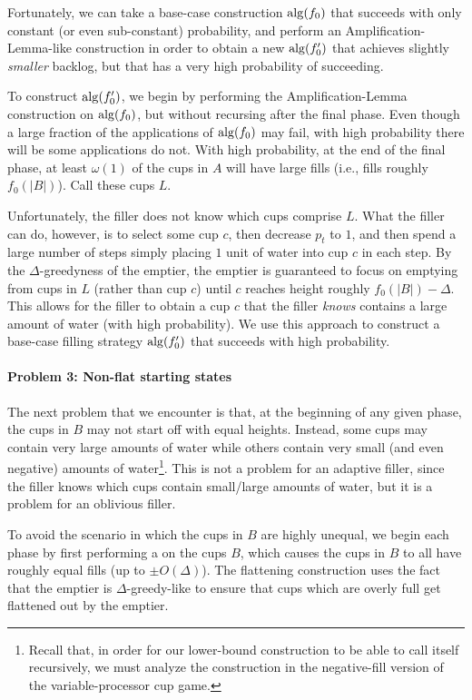 Fortunately, we can take a base-case construction $\operatorname{\text{\textup{alg}}}(f_0)$ that
succeeds with only constant (or even sub-constant) probability, and
perform an Amplification-Lemma-like construction in order to obtain a
new $\operatorname{\text{\textup{alg}}}(f_0')$ that achieves slightly \emph{smaller} backlog, but
that has a very high probability of succeeding.

To construct $\operatorname{\text{\textup{alg}}}(f_0')$, we begin by performing the
Amplification-Lemma construction on $\operatorname{\text{\textup{alg}}}(f_0)$, but without recursing
after the final phase. Even though a large fraction of the
applications of $\operatorname{\text{\textup{alg}}}(f_0)$ may fail, with high probability there will
be some applications do not. With high probability, at the end of the
final phase, at least $\omega(1)$ of the cups in $A$ will have large fills
(i.e., fills roughly $f_0(|B|)$). Call these cups $L$.

Unfortunately, the filler does not know which cups comprise $L$. What
the filler can do, however, is to select some cup $c$, then decrease
$p_t$ to $1$, and then spend a large number of steps simply placing
$1$ unit of water into cup $c$ in each step. By the
$\Delta$-greedyness of the emptier, the emptier is guaranteed to focus
on emptying from cups in $L$ (rather than cup $c$) until $c$ reaches
height roughly $f_0(|B|) - \Delta$. This allows for the filler to
obtain a cup $c$ that the filler \emph{knows} contains a large amount
of water (with high probability). We use this approach to construct a
base-case filling strategy $\operatorname{\text{\textup{alg}}}(f_0')$ that succeeds with high
probability.

\paragraph{Problem 3: Non-flat starting states}
The next problem that we encounter is that, at the beginning of any
given phase, the cups in $B$ may not start off with equal
heights. Instead, some cups may contain very large amounts of water
while others contain very small (and even negative) amounts of
water\footnote{Recall that, in order for our lower-bound construction to be able to call itself recursively, we must analyze the construction in the negative-fill version of the variable-processor cup game.}. This is not a problem for an adaptive filler, since the filler
knows which cups contain small/large amounts of water, but it is a
problem for an oblivious filler.

To avoid the scenario in which the cups in $B$ are highly unequal, we
begin each phase by first performing a 
on the cups $B$, which causes the cups in $B$ to all have roughly
equal fills (up to $\pm O(\Delta)$). The flattening construction uses
the fact that the emptier is $\Delta$-greedy-like to ensure that cups
which are overly full get flattened out by the emptier.

